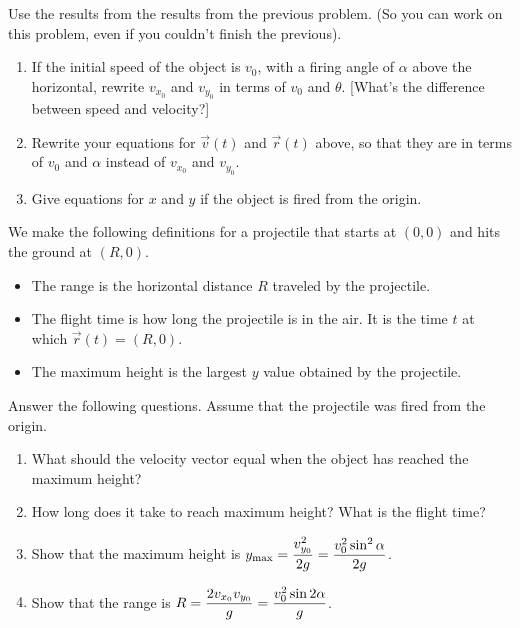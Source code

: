 \begin{problem}\label{projectile formulas from origin}
Use the results from the results from the previous problem. (So you can work on this problem, even if you couldn't finish the previous).
\begin{enumerate}
 \item If the initial speed of the object is $v_0$, with a firing angle of $\alpha$ above the horizontal, rewrite $v_{x_0}$ and $v_{y_0}$ in terms of $v_0$ and $\theta$. [What's the difference between speed and velocity?]
 \item Rewrite your equations for $\vec v(t)$ and $\vec r(t)$ above, so that they are in terms of $v_0$ and $\alpha$ instead of $v_{x_0}$ and $v_{y_0}$.
 \item Give equations for $x$ and $y$ if the object is fired from the origin. 
\end{enumerate}
\end{problem}
 
We make the following definitions for a projectile that starts at $(0,0)$ and hits the ground at $(R,0)$.
\begin{itemize}
 \item The range is the horizontal distance $R$ traveled by the projectile.  
 \item The flight time is how long the projectile is in the air. It is the time $t$ at which $\vec r(t)=(R,0)$.
 \item The maximum height is the largest $y$ value obtained by the projectile. 
\end{itemize}


\begin{problem}%
 Answer the following questions. Assume that the projectile was fired from the origin.
\begin{enumerate}
 \item What should the velocity vector equal when the object has reached the maximum height?
 \item How long does it take to reach maximum height? What is the flight time?
 \item Show that the maximum height is $\displaystyle y_{\max}=\frac{v_{y_0}^2}{2g}=\frac{v_0^2\sin^2\alpha}{2g}$.
 \item Show that the range is $\displaystyle R=\frac{2v_{x_0}v_{y_0}}{g}=\frac{v_0^2\sin2\alpha}{g}$. 
\end{enumerate}
\end{problem}


